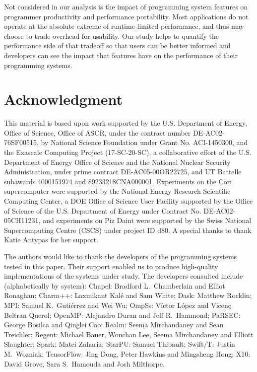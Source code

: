 Not considered in our analysis is the impact of programming system
features on programmer productivity and performance portability. Most
applications do not operate at the absolute extreme of runtime-limited
performance, and thus may choose to trade overhead for
usability. Our study helps to quantify the performance side of that
tradeoff so that users can be better informed and developers can see
the impact that features have on the performance of their programming
systems.

\section*{Acknowledgment}

This material is based upon work supported by the U.S. Department of
Energy, Office of Science, Office of ASCR, under the contract number
DE-AC02-76SF00515, by National Science Foundation under Grant
No. ACI-1450300, and the Exascale Computing Project (17-SC-20-SC), a
collaborative effort of the U.S. Department of Energy Office of
Science and the National Nuclear Security Administration, under prime
contract DE-AC05-00OR22725, and UT Battelle subawards 4000151974 and
89233218CNA000001. Experiments on the Cori supercomputer were
supported by the National Energy Research Scientific Computing Center,
a DOE Office of Science User Facility supported by the Office of
Science of the U.S. Department of Energy under Contract
No. DE-AC02-05CH11231, and experiments on Piz Daint were supported by
the Swiss National Supercomputing Centre (CSCS) under project ID
d80. A special thanks to thank Katie Antypas for her support.

The authors would like to thank the developers of the programming
systems tested in this paper. Their support enabled us to produce
high-quality implementations of the systems under study. The
developers consulted include (alphabetically by system): Chapel:
Bradford L.~Chamberlain and Elliot Ronaghan; Charm++: Laxmikant Kalé
and Sam White; Dask: Matthew Rocklin; MPI: Samuel K.~Gutiérrez and Wei
Wu; OmpSs: Víctor López and Vicenç Beltran Querol; OpenMP: Alejandro
Duran and Jeff R.~Hammond; PaRSEC: George Bosilca and Qinglei Cao;
Realm: Seema Mirchandaney and Sean Treichler; Regent: Michael Bauer,
Wonchan Lee, Seema Mirchandaney and Elliott Slaughter; Spark: Matei
Zaharia; StarPU: Samuel Thibault; Swift/T: Justin M.~Wozniak;
TensorFlow: Jing Dong, Peter Hawkins and Mingsheng Hong; X10: David
Grove, Sara S.~Hamouda and Josh Milthorpe.
